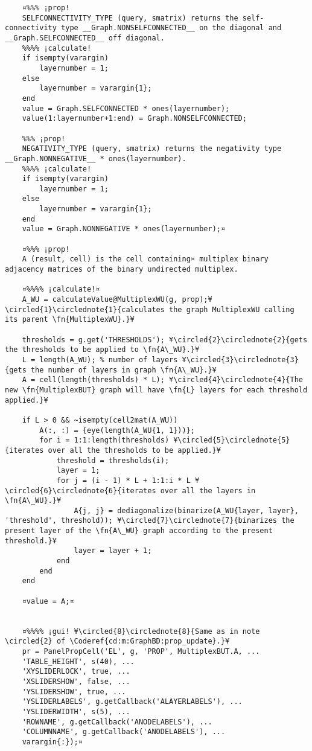 \documentclass{tufte-handout}
\begin{document}
\begin{lstlisting}
	¤%%% ¡prop!
	SELFCONNECTIVITY_TYPE (query, smatrix) returns the self-connectivity type __Graph.NONSELFCONNECTED__ on the diagonal and __Graph.SELFCONNECTED__ off diagonal.
	%%%% ¡calculate!
	if isempty(varargin)
		layernumber = 1;
	else
		layernumber = varargin{1};
	end
	value = Graph.SELFCONNECTED * ones(layernumber);
	value(1:layernumber+1:end) = Graph.NONSELFCONNECTED;                
	
	%%% ¡prop!
	NEGATIVITY_TYPE (query, smatrix) returns the negativity type __Graph.NONNEGATIVE__ * ones(layernumber).
	%%%% ¡calculate!
	if isempty(varargin)
		layernumber = 1;
	else
		layernumber = varargin{1};
	end
	value = Graph.NONNEGATIVE * ones(layernumber);¤
	
	¤%%% ¡prop!
	A (result, cell) is the cell containing¤ multiplex binary adjacency matrices of the binary undirected multiplex.
	
	¤%%%% ¡calculate!¤
	A_WU = calculateValue@MultiplexWU(g, prop);¥\circled{1}\circlednote{1}{calculates the graph MultiplexWU calling its parent \fn{MultiplexWU}.}¥
	
	thresholds = g.get('THRESHOLDS'); ¥\circled{2}\circlednote{2}{gets the thresholds to be applied to \fn{A\_WU}.}¥
	L = length(A_WU); % number of layers ¥\circled{3}\circlednote{3}{gets the number of layers in graph \fn{A\_WU}.}¥
	A = cell(length(thresholds) * L); ¥\circled{4}\circlednote{4}{The new \fn{MultiplexBUT} graph will have \fn{L} layers for each threshold applied.}¥
	
	if L > 0 && ~isempty(cell2mat(A_WU))
		A(:, :) = {eye(length(A_WU{1, 1}))};
		for i = 1:1:length(thresholds) ¥\circled{5}\circlednote{5}{iterates over all the thresholds to be applied.}¥
			threshold = thresholds(i);
			layer = 1;
			for j = (i - 1) * L + 1:1:i * L ¥\circled{6}\circlednote{6}{iterates over all the layers in \fn{A\_WU}.}¥
				A{j, j} = dediagonalize(binarize(A_WU{layer, layer}, 'threshold', threshold)); ¥\circled{7}\circlednote{7}{binarizes the present layer of the \fn{A\_WU} graph according to the present threshold.}¥
				layer = layer + 1;
			end
		end
	end
	
	¤value = A;¤


	¤%%%% ¡gui! ¥\circled{8}\circlednote{8}{Same as in note \circled{2} of \Coderef{cd:m:GraphBD:prop_update}.}¥
	pr = PanelPropCell('EL', g, 'PROP', MultiplexBUT.A, ...
	'TABLE_HEIGHT', s(40), ...
	'XYSLIDERLOCK', true, ... 
	'XSLIDERSHOW', false, ...
	'YSLIDERSHOW', true, ...
	'YSLIDERLABELS', g.getCallback('ALAYERLABELS'), ...
	'YSLIDERWIDTH', s(5), ...
	'ROWNAME', g.getCallback('ANODELABELS'), ...
	'COLUMNNAME', g.getCallback('ANODELABELS'), ...
	varargin{:});¤
	

\end{lstlisting}
\end{document}
